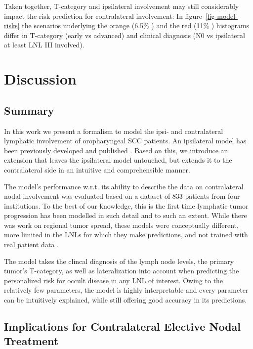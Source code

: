 \documentclass[
  sn-mathphys-num,
]{sn-jnl}
\begin{document}
Taken together, T-category and ipsilateral involvement may still
considerably impact the risk prediction for contralateral involvement:
In figure~\ref{fig-model-risks} the scenarios underlying the orange
(6.5\% ) and the red (11\% ) histograms differ in T-category (early vs
advanced) and clinical diagnosis (N0 vs ipsilateral at least LNL III
involved).

\section{Discussion}\label{sec-discussion}

\subsection{Summary}\label{summary}

In this work we present a formalism to model the ipsi- and contralateral
lymphatic involvement of oropharyngeal SCC patients. An ipsilateral
model has been previously developed and published
\citep{ludwig_hidden_2021, ludwig_modelling_2023}. Based on this, we
introduce an extension that leaves the ipsilateral model untouched, but
extends it to the contralateral side in an intuitive and comprehensible
manner.

The model's performance w.r.t. its ability to describe the data on
contralateral nodal involvement was evaluated based on a dataset of 833
patients from four institutions. To the best of our knowledge, this is
the first time lymphatic tumor progression has been modelled in such
detail and to such an extent. While there was work on regional tumor
spread, these models were conceptually different, more limited in the
LNLs for which they make predictions, and not trained with real patient
data \citep{benson_markov_2006, jung_development_2017}.

The model takes the clincal diagnosis of the lymph node levels, the
primary tumor's T-category, as well as lateralization into account when
predicting the personalized risk for occult disease in any LNL of
interest. Owing to the relatively few parameters, the model is highly
interpretable and every parameter can be intuitively explained, while
still offering good accuracy in its predictions.

\subsection{Implications for Contralateral Elective Nodal
Treatment}\label{implications-for-contralateral-elective-nodal-treatment}
\end{document}
